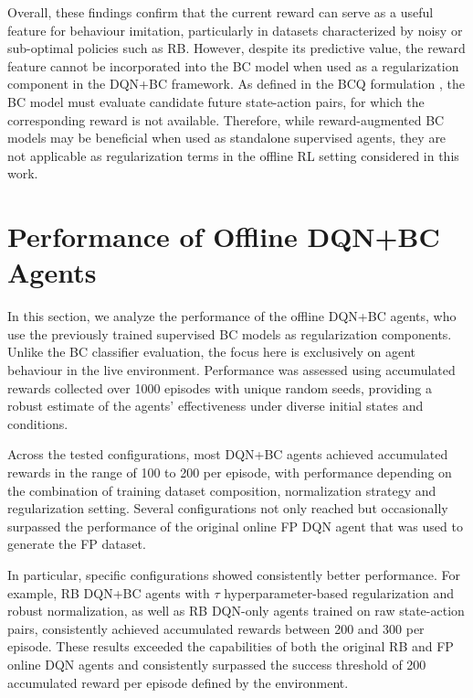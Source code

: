 Overall, these findings confirm that the current reward can serve as a useful feature for behaviour imitation, particularly in datasets characterized by noisy or sub-optimal policies such as RB. However, despite its predictive value, the reward feature cannot be incorporated into the BC model when used as a regularization component in the DQN+BC framework. As defined in the BCQ formulation \cite{BCQ_benchmarking}, the BC model must evaluate candidate future state-action pairs, for which the corresponding reward is not available. Therefore, while reward-augmented BC models may be beneficial when used as standalone supervised agents, they are not applicable as regularization terms in the offline RL setting considered in this work.







\section{Performance of Offline DQN+BC Agents}
In this section, we analyze the performance of the offline DQN+BC agents, who use the previously trained supervised BC models as regularization components. Unlike the BC classifier evaluation, the focus here is exclusively on agent behaviour in the live environment. Performance was assessed using accumulated rewards collected over 1000 episodes with unique random seeds, providing a robust estimate of the agents' effectiveness under diverse initial states and conditions.

Across the tested configurations, most DQN+BC agents achieved accumulated rewards in the range of 100 to 200 per episode, with performance depending on the combination of training dataset composition, normalization strategy and regularization setting. Several configurations not only reached but occasionally surpassed the performance of the original online FP DQN agent that was used to generate the FP dataset.  

In particular, specific configurations showed consistently better performance. For example, RB DQN+BC agents with $\tau$ hyperparameter-based regularization and robust normalization, as well as RB DQN-only agents trained on raw state-action pairs, consistently achieved accumulated rewards between 200 and 300 per episode. These results exceeded the capabilities of both the original RB and FP online DQN agents and consistently surpassed the success threshold of 200 accumulated reward per episode defined by the environment.


